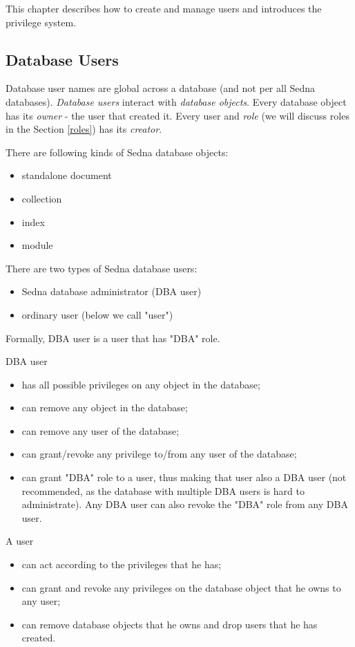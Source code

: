 \documentclass[a4paper,12pt]{article}
\begin{document}
This chapter describes how to create and manage users and introduces the privilege system.

\subsection{Database Users}

Database user names are global across a database (and not per all Sedna databases). \emph{Database users} interact with \emph{database objects}. Every database object has its \emph{owner} - the user that created it. Every user and \emph{role} (we will discuss roles in the Section \ref{roles}) has its \emph{creator}.

There are following kinds of Sedna database objects:
\begin{itemize}
\item standalone document
\item collection
\item index
\item module
\end{itemize}

There are two types of Sedna database users:

\begin{itemize}
\item Sedna database administrator (DBA user)
\item ordinary user (below we call "user")
\end{itemize}

Formally, DBA user is a user that has "DBA" role.

DBA user
\begin{itemize}
\item has all possible privileges on any object in the database;
\item can remove any object in the database;
\item can remove any user of the database;
\item can grant/revoke any privilege to/from any user of the database;
\item can grant "DBA" role to a user, thus making that user also a DBA user (not recommended, as the database with multiple DBA users is hard to administrate). Any DBA user can also revoke the "DBA" role from any DBA user.
\end{itemize}

A user
\begin{itemize}
\item can act according to the privileges that he has;
\item can grant and revoke any privileges on the database object that he owns to any user;
\item can remove database objects that he owns and drop users that he has created.
\end{itemize}
\end{document}
